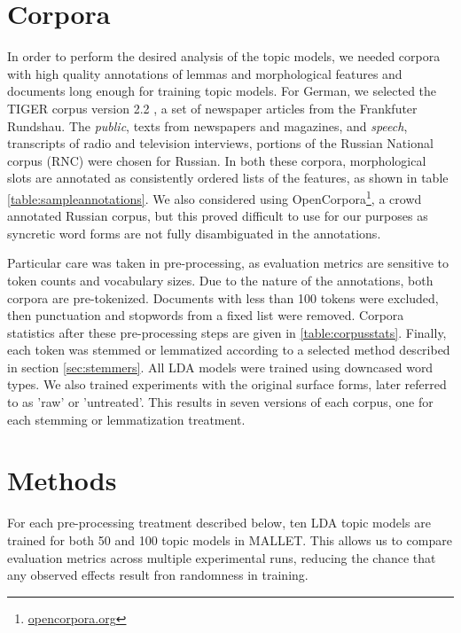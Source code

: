\documentclass[11pt,a4paper]{article}
\begin{document}
\section{Corpora}
In order to perform the desired analysis of the topic models, we needed corpora with high quality annotations of lemmas and morphological features and documents long enough for training topic models. For German, we selected the TIGER corpus version 2.2 \cite{Brants2004TIGERLI}, a set of newspaper articles from the Frankfuter Rundshau. The \textit{public}, texts from newspapers and magazines, and \textit{speech}, transcripts of radio and television interviews, portions of the Russian National corpus (RNC) were chosen for Russian. In both these corpora, morphological slots are annotated as consistently ordered lists of the features, as shown in table \ref{table:sampleannotations}. We also considered using OpenCorpora\footnote{\url{opencorpora.org}}, a crowd annotated Russian corpus, but this proved difficult to use for our purposes as syncretic word forms are not fully disambiguated in the annotations.

Particular care was taken in pre-processing, as evaluation metrics are sensitive to token counts and vocabulary sizes. Due to the nature of the annotations, both corpora are pre-tokenized. Documents with less than 100 tokens were excluded, then punctuation and stopwords from a fixed list were removed. Corpora statistics after these pre-processing steps are given in \ref{table:corpusstats}. Finally, each token was stemmed or lemmatized according to a selected method described in section \ref{sec:stemmers}. All LDA models were trained using downcased word types. We also trained experiments with the original surface forms, later referred to as 'raw' or 'untreated'. This results in seven versions of each corpus, one for each stemming or lemmatization treatment.


\section{Methods}
For each pre-processing treatment described below, ten LDA topic models are trained for both 50 and 100 topic models in MALLET. This allows us to compare evaluation metrics across multiple experimental runs, reducing the chance that any observed effects result fron randomness in training.
\end{document}
